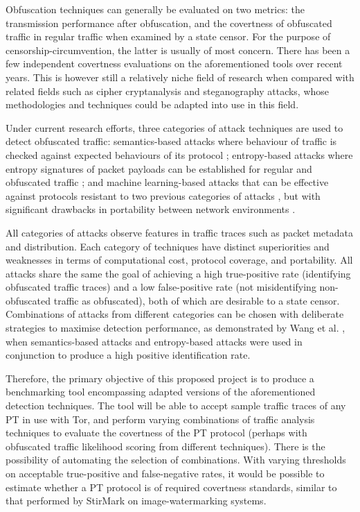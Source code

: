 \documentclass[11pt]{article}
\begin{document}
Obfuscation techniques can generally be evaluated on two metrics: the transmission performance after obfuscation, and the covertness of obfuscated traffic in regular traffic when examined by a state censor. For the purpose of censorship-circumvention, the latter is usually of most concern. There has been a few independent covertness evaluations on the aforementioned tools \cite{tan2015towards} \cite{houmansadr2013parrot} \cite{wang2015seeing} over recent years. This is however still a relatively niche field of research when compared with related fields such as cipher cryptanalysis and steganography attacks, whose methodologies and techniques could be adapted into use in this field.

Under current research efforts, three categories of attack techniques are used to detect obfuscated traffic: semantics-based attacks where behaviour of traffic is checked against expected behaviours of its protocol \cite[Sec. VIII]{houmansadr2013parrot} \cite[Sec. 4]{wang2015seeing}; entropy-based attacks where entropy signatures of packet payloads can be established for regular and obfuscated traffic \cite{tan2015towards} \cite[Sec. 5]{wang2015seeing}; and machine learning-based attacks that can be effective against protocols resistant to two previous categories of attacks \cite[Sec. 6]{wang2015seeing}, but with significant drawbacks in portability between network environments \cite{dixon2016network}. 

All categories of attacks observe features in traffic traces such as packet metadata and distribution. Each category of techniques have distinct superiorities and weaknesses in terms of computational cost, protocol coverage, and portability. All attacks share the same the goal of achieving a high true-positive rate (identifying obfuscated traffic traces) and a low false-positive rate (not misidentifying non-obfuscated traffic as obfuscated), both of which are desirable to a state censor. Combinations of attacks from different categories can be chosen with deliberate strategies to maximise detection performance, as demonstrated by Wang et al. \cite[Sec. 5.2]{wang2015seeing}, when semantics-based attacks and entropy-based attacks were used in conjunction to produce a high positive identification rate.

Therefore, the primary objective of this proposed project is to produce a benchmarking tool encompassing adapted versions of the aforementioned detection techniques. The tool will be able to accept sample traffic traces of any PT in use with Tor, and perform varying combinations of traffic analysis techniques to evaluate the covertness of the PT protocol (perhaps with obfuscated traffic likelihood scoring from different techniques). There is the possibility of automating the selection of combinations. With varying thresholds on acceptable true-positive and false-negative rates, it would be possible to estimate whether a PT protocol is of required covertness standards, similar to that performed by StirMark \cite{petitcolas1998attacks} on image-watermarking systems.
\end{document}
